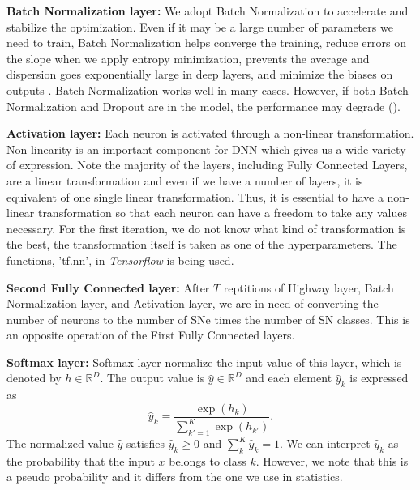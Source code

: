 \documentclass[useamsfonts]{pasj01}
\begin{document}
{\bf Batch Normalization layer:}
We adopt Batch Normalization \citep{batch_norm} to accelerate and stabilize the optimization. Even if it may be a large number of parameters we need to train, Batch Normalization helps converge the training, reduce errors on the slope when we apply entropy minimization, prevents the average and dispersion goes exponentially large in deep layers, and minimize the biases on outputs \citep{understanding_batch_norm}.
Batch Normalization works well in many cases. However, if both Batch Normalization and Dropout are in the model, the performance may degrade (\cite{dropout_and_batch_norm}).   

{\bf Activation layer:}
Each neuron is activated through a non-linear transformation.  Non-linearity is an important component for DNN which gives us a wide variety of expression.   Note the majority of the layers, including Fully Connected Layers, are a linear transformation and even if we have a number of layers, it is equivalent of one single linear transformation.   Thus, it is essential to have a non-linear transformation so that each neuron can have a freedom to take any values necessary.
For the first iteration, we do not know what kind of transformation is the best, the transformation itself is taken as one of the hyperparameters.  The functions, 'tf.nn', in {\it Tensorflow} is being used.

{\bf Second Fully Connected layer:}
After $T$ reptitions of Highway layer, Batch Normalization layer, and Activation layer,
we are in need of converting the number of neurons to the number of SNe times the number of SN classes.   This is an opposite operation of the First Fully Connected layers.

{\bf Softmax layer:}
Softmax layer normalize the input value of this layer, which is denoted by $h \in \mathbb{R}^D$. The output value is $\hat{y} \in \mathbb{R}^D$ and each element $\hat{y}_k$ is expressed as
\begin{equation}
    \hat{y}_k = \frac{\exp \left( h_k \right)}{\sum_{k'=1}^K \exp \left( h_{k'} \right)}.
\end{equation}
The normalized value $\hat{y}$ satisfies $\hat{y}_k \geq 0$ and $\sum_k^K \hat{y}_k =1$.
We can interpret $\hat{y}_k$ as the probability that the input $x$ belongs to  class $k$.
However, we note that this is a pseudo probability and it differs from the one we use in statistics.
  
\end{document}

